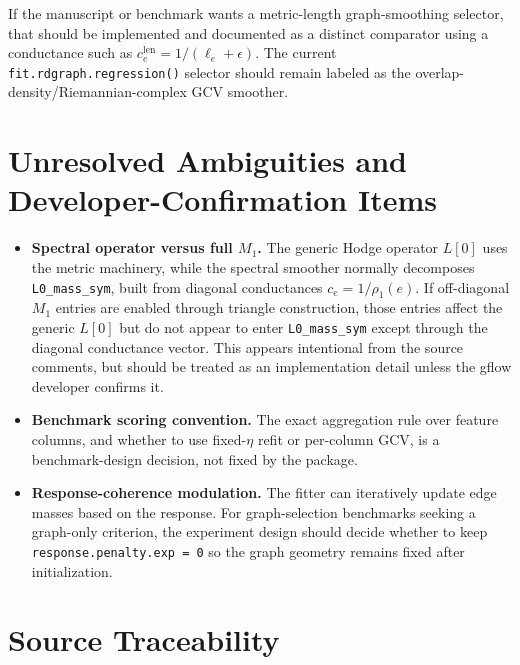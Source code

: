 \documentclass[11pt]{article}
\newcommand{\code}[1]{\texttt{#1}}
\begin{document}
If the manuscript or benchmark wants a metric-length graph-smoothing selector,
that should be implemented and documented as a distinct comparator using a
conductance such as \(c_e^{\mathrm{len}}=1/(\ell_e+\epsilon)\). The current
\code{fit.rdgraph.regression()} selector should remain labeled as the
overlap-density/Riemannian-complex GCV smoother.

\section{Unresolved Ambiguities and Developer-Confirmation Items}

\begin{itemize}[leftmargin=1.5em]
  \item \textbf{Spectral operator versus full \(M_1\).} The generic Hodge
  operator \(L[0]\) uses the metric machinery, while the spectral smoother
  normally decomposes \code{L0\_mass\_sym}, built from diagonal conductances
  \(c_e=1/\rho_1(e)\). If off-diagonal \(M_1\) entries are enabled through
  triangle construction, those entries affect the generic \(L[0]\) but do not
  appear to enter \code{L0\_mass\_sym} except through the diagonal conductance
  vector. This appears intentional from the source comments, but should be
  treated as an implementation detail unless the gflow developer confirms it.
  \item \textbf{Benchmark scoring convention.} The exact aggregation rule over
  feature columns, and whether to use fixed-\(\eta\) refit or per-column GCV,
  is a benchmark-design decision, not fixed by the package.
  \item \textbf{Response-coherence modulation.} The fitter can iteratively
  update edge masses based on the response. For graph-selection benchmarks
  seeking a graph-only criterion, the experiment design should decide whether
  to keep \code{response.penalty.exp = 0} so the graph geometry remains fixed
  after initialization.
\end{itemize}

\section{Source Traceability}
\end{document}
